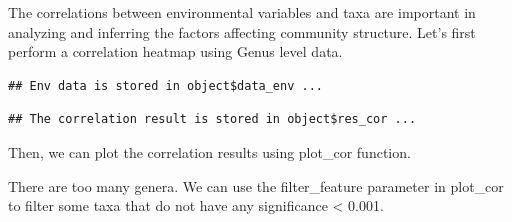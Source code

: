 \documentclass[
]{book}
\newenvironment{Shaded}{\begin{snugshade}}{\end{snugshade}}
\newcommand{\AttributeTok}[1]{\textcolor[rgb]{0.77,0.63,0.00}{#1}}
\newcommand{\CommentTok}[1]{\textcolor[rgb]{0.56,0.35,0.01}{\textit{#1}}}
\newcommand{\DecValTok}[1]{\textcolor[rgb]{0.00,0.00,0.81}{#1}}
\newcommand{\FunctionTok}[1]{\textcolor[rgb]{0.00,0.00,0.00}{#1}}
\newcommand{\NormalTok}[1]{#1}
\newcommand{\OtherTok}[1]{\textcolor[rgb]{0.56,0.35,0.01}{#1}}
\newcommand{\SpecialCharTok}[1]{\textcolor[rgb]{0.00,0.00,0.00}{#1}}
\newcommand{\StringTok}[1]{\textcolor[rgb]{0.31,0.60,0.02}{#1}}
\begin{document}
The correlations between environmental variables and taxa are important in analyzing and inferring the factors affecting community structure.
Let's first perform a correlation heatmap using Genus level data.

\begin{Shaded}
\end{Shaded}

\begin{verbatim}
## Env data is stored in object$data_env ...
\end{verbatim}

\begin{Shaded}
\end{Shaded}

\begin{verbatim}
## The correlation result is stored in object$res_cor ...
\end{verbatim}

\begin{Shaded}
\end{Shaded}

Then, we can plot the correlation results using plot\_cor function.

\begin{Shaded}
\end{Shaded}

There are too many genera.
We can use the filter\_feature parameter in plot\_cor to filter some taxa that do not have any significance \textless{} 0.001.
\end{document}

